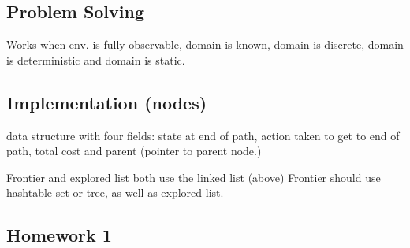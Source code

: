 \documentclass[11pt,letterpaper]{article}
\begin{document}
\subsection{Problem Solving}
Works when env. is fully observable, domain is known, domain is discrete, domain is deterministic and domain is static.

\subsection{Implementation (nodes)}
data structure with four fields: state at end of path, action taken to get to end of path, total cost and parent (pointer to parent node.)

Frontier and explored list both use the linked list (above)
Frontier should use hashtable set or tree, as well as explored list.

\subsection{Homework 1}
\end{document}

